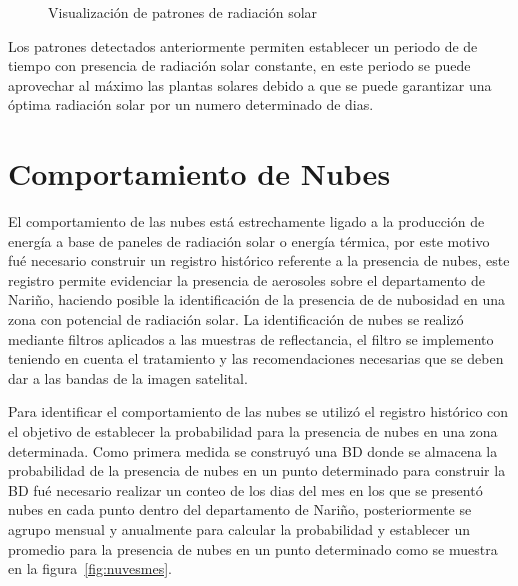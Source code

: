 \begin{figure}[htbp]
  \caption{Visualización de patrones de radiación solar}
  \label{fig:visualizarpatron}
\end{figure}

Los patrones detectados anteriormente permiten establecer un periodo de de tiempo con presencia de radiación solar constante, en este periodo se puede aprovechar 
al máximo las plantas solares debido a que se puede garantizar una óptima radiación solar por un numero determinado de dias.
\newpage

\section{Comportamiento de Nubes}

El comportamiento de las nubes está estrechamente ligado a la producción de energía a base de paneles de radiación solar
o energía térmica, por este motivo fué necesario construir un registro histórico referente a la presencia de nubes, 
este registro permite evidenciar la presencia de aerosoles sobre el departamento de Nariño, haciendo
posible la identificación de la presencia de de nubosidad en una zona con potencial de radiación solar. La identificación de nubes se realizó 
mediante filtros aplicados a las muestras de reflectancia, el filtro se implemento teniendo en cuenta el tratamiento y las recomendaciones necesarias 
que se deben dar a las bandas de la imagen satelital\cite{modisweb}\cite{bandMODISspecification}\cite{cea2005mejoras}.

Para identificar el comportamiento de las nubes se utilizó el registro histórico con el objetivo de establecer la probabilidad 
para la presencia de nubes en una zona determinada. Como primera medida se construyó una BD donde se almacena la 
probabilidad de la presencia de nubes en un punto determinado para construir la BD fué necesario realizar un conteo de los dias
del mes en los que se presentó nubes en cada punto dentro del departamento de Nariño, posteriormente se agrupo mensual y anualmente para calcular 
la probabilidad y establecer un promedio para la presencia de nubes en un punto determinado como se muestra en la figura~\ref{fig:nuvesmes}. 

